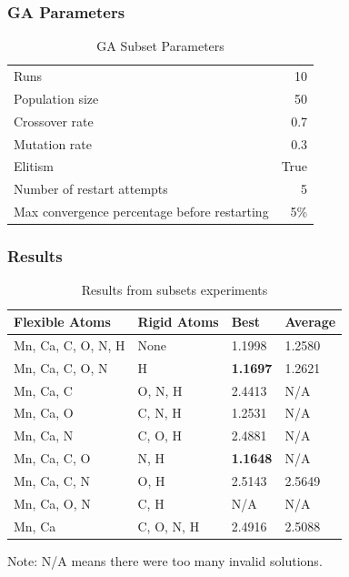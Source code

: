 \documentclass[10pt]{beamer}
\begin{document}
\begin{frame}
	\frametitle{GA Parameters}

	\begin{table}
		\caption{GA Subset Parameters}
		\begin{tabular}{ l r }
		  \hline
		    Runs & 10 \\
		    Population size & 50 \\
		    Crossover rate & 0.7 \\
		    Mutation rate & 0.3 \\
		    Elitism & True \\
		    Number of restart attempts & 5 \\
		    Max convergence percentage before restarting & 5\% \\
		  \hline
		\end{tabular}
	\end{table}

\end{frame}

\begin{frame}
	\frametitle{Results}

	\begin{table}
		\caption{Results from subsets experiments}
		\begin{tabular}{ | l | l | l | l | }
			\hline
			Flexible Atoms & Rigid Atoms & Best & Average \\ \hline \hline
			Mn, Ca, C, O, N, H & None & 1.1998 & 1.2580 \\ \hline
			Mn, Ca, C, O, N & H & \textbf{1.1697} & 1.2621 \\ \hline
			Mn, Ca, C & O, N, H & 2.4413 & N/A \\ \hline
			Mn, Ca, O & C, N, H & 1.2531 & N/A \\ \hline
			Mn, Ca, N & C, O, H & 2.4881 & N/A \\ \hline
			Mn, Ca, C, O & N, H & \textbf{1.1648} & N/A \\ \hline
			Mn, Ca, C, N & O, H & 2.5143 & 2.5649 \\ \hline
			Mn, Ca, O, N & C, H & N/A & N/A \\ \hline
			Mn, Ca & C, O, N, H & 2.4916 & 2.5088 \\ \hline
		\end{tabular}
	\end{table}

	Note: N/A means there were too many invalid solutions.

\end{frame}
\end{document}
